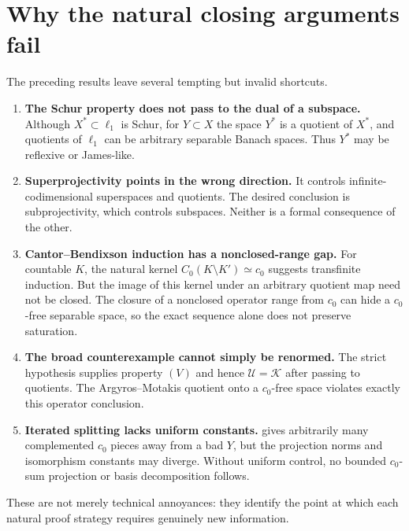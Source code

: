 \documentclass[11pt]{article}
\theoremstyle{definition}
\newcommand{\cU}{\mathcal U}
\newcommand{\cK}{\mathcal K}
\newcommand{\isom}{\simeq}
\begin{document}
\section{Why the natural closing arguments fail}

The preceding results leave several tempting but invalid shortcuts.

\begin{enumerate}
\item \textbf{The Schur property does not pass to the dual of a subspace.}
      Although $X^*\subset\ell_1$ is Schur, for $Y\subset X$ the space
      $Y^*$ is a quotient of $X^*$, and quotients of $\ell_1$ can be
      arbitrary separable Banach spaces.  Thus $Y^*$ may be reflexive or
      James-like.

\item \textbf{Superprojectivity points in the wrong direction.}
      It controls infinite-codimensional superspaces and quotients.  The
      desired conclusion is subprojectivity, which controls subspaces.
      Neither is a formal consequence of the other.

\item \textbf{Cantor--Bendixson induction has a nonclosed-range gap.}
      For countable $K$, the natural kernel
      $C_0(K\setminus K')\isom c_0$ suggests transfinite induction.  But the
      image of this kernel under an arbitrary quotient map need not be
      closed.  The closure of a nonclosed operator range from $c_0$ can hide
      a $c_0$-free separable space, so the exact sequence alone does not
      preserve saturation.

\item \textbf{The broad counterexample cannot simply be renormed.}
      The strict hypothesis supplies property $(V)$ and hence
      $\cU=\cK$ after passing to quotients.  The Argyros--Motakis quotient
      onto a $c_0$-free space violates exactly this operator conclusion.

\item \textbf{Iterated splitting lacks uniform constants.}
       gives arbitrarily many complemented $c_0$ pieces
      away from a bad $Y$, but the projection norms and isomorphism constants
      may diverge.  Without uniform control, no bounded $c_0$-sum projection
      or basis decomposition follows.
\end{enumerate}

These are not merely technical annoyances: they identify the point at which
each natural proof strategy requires genuinely new information.
\end{document}
